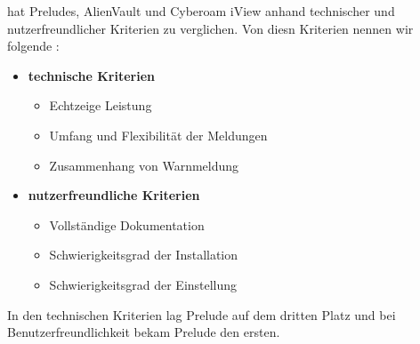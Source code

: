 




\cite{Grammatikis_Prelude} hat Preludes, AlienVault und Cyberoam iView anhand technischer und nutzerfreundlicher Kriterien zu verglichen. Von diesn Kriterien nennen wir folgende \citep{Grammatikis_Prelude}:

\begin{itemize}[noitemsep]
   \item \textbf{technische Kriterien}
   \begin{itemize}[noitemsep]
      \item Echtzeige Leistung %
      \item Umfang und Flexibilität der Meldungen %
      \item Zusammenhang von Warnmeldung %
   \end{itemize}

   \item \textbf{nutzerfreundliche Kriterien}
   \begin{itemize}[noitemsep]
      \item Vollständige Dokumentation %
      \item Schwierigkeitsgrad der Installation %
      \item Schwierigkeitsgrad der Einstellung %
   \end{itemize}
\end{itemize}

In den technischen Kriterien lag Prelude auf dem dritten Platz und bei Benutzerfreundlichkeit bekam Prelude den ersten.



